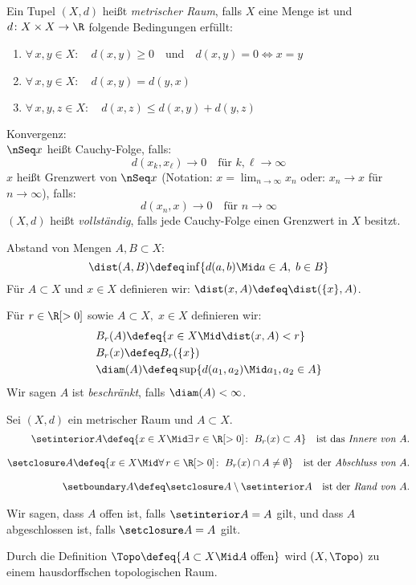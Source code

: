 \begin{thEmpty}[Metrik]
    Ein Tupel $(X,d)$ heißt \emph{metrischer Raum}, falls $X$ eine Menge ist 
    und $d\colon X\times X\to\R$ folgende Bedingungen erfüllt:
    \begin{enumerate}[({M}1),leftmargin=2cm]
        \item
            $\forall\,x,y\in X\colon\quad
            d(x,y)\geq 0$~~und~~$d(x,y) = 0 \iff x=y$
        \item
            $\forall\,x,y\in X\colon\quad d(x,y) = d(y,x)$
        \item
            $\forall\,x,y,z\in X\colon\quad d(x,z)\leq d(x,y)+d(y,z)$
    \end{enumerate}
    
    Konvergenz:\\
    $\nSeq x$ heißt Cauchy-Folge, falls:
    \[ d(x_k,x_\ell) \to 0 \quad\text{für } k,\ell\to\infty \]
    $x$ heißt Grenzwert von $\nSeq x$ (Notation:
    $x=\lim_{n\to\infty} x_n$ oder: $x_n\to x$ für $n\to\infty$), falls:
    \[ d(x_n,x)\to 0 \quad\text{für } n\to\infty \]
    $(X,d)$ heißt \emph{vollständig}, falls jede Cauchy-Folge einen Grenzwert in
    $X$ besitzt.
    
    Abstand von Mengen $A,B\subset X$:
    \[ \dist(A,B) \defeq \inf \{ d(a,b) \Mid a\in A,\; b\in B \} \]
    Für $A\subset X$ und $x\in X$ definieren wir: $\dist(x,A) \defeq
    \dist(\{x\},A)$.
    
    Für $r\in\R[>0]$ sowie $A\subset X,\;x\in X$ definieren wir:
    \begin{align*}
        & B_r(A) \defeq \{ x\in X \Mid \dist(x,A) < r \}    \\
        & B_r(x) \defeq B_r(\{x\})                          \\
        & \diam(A) \defeq \sup \{ d(a_1,a_2) \Mid a_1,a_2\in A \}
    \end{align*}
    Wir sagen $A$ ist \emph{beschränkt}, falls $\diam(A)<\infty$.
\end{thEmpty}

\begin{thEmpty}
    Sei $(X,d)$ ein metrischer Raum und $A\subset X$.
    \begin{align*}
        \setinterior A \defeq \{ x\in X \Mid \exists\,r\in\R[>0]\colon\;
        B_r(x) \subset A \}
        \quad\text{ist das \emph{Innere von $A$}}.
        \\[2ex]
        \setclosure A \defeq \{ x\in X \Mid \forall\,r\in\R[>0]\colon\;
        B_r(x) \cap A \neq \emptyset \}
        \quad\text{ist der \emph{Abschluss von $A$}}.
        \\[2ex]
        \setboundary A \defeq \setclosure A \setminus \setinterior A
        \quad\text{ist der \emph{Rand von $A$}}.
    \end{align*}
    
    Wir sagen, dass $A$ offen ist, falls $\setinterior A = A$ gilt,
    und dass $A$ abgeschlossen ist, falls $\setclosure A = A$ gilt.
    
    Durch die Definition $\Topo \defeq \{ A\subset X \Mid A\text{ offen} \}$
    wird $(X,\Topo)$ zu einem hausdorffschen topologischen Raum.
\end{thEmpty}
